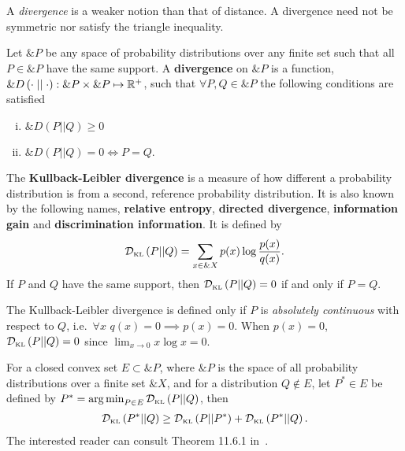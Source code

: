 \begin{remark}
  A \textit{divergence} is a weaker notion than that of distance. A divergence
  need not be symmetric nor satisfy the triangle inequality.
\end{remark}

\begin{definition}
  Let $\&P$ be any space of probability distributions over any finite set such
  that all
  $P \in \&P$ have the same support. A \textbf{divergence} on $\&P$ is a
  function, $\&D\left( \cdot \mid\mid \cdot \right): \&P \times \&P \mapsto
  \mathbb{R}^+$, such that $\forall P, Q \in \&P$ the following conditions are
  satisfied
  \begin{enumerate}[(i)]
  \item $\&D(P||Q) \geq 0$
  \item $\&D(P||Q) = 0 \iff P = Q$.
  \end{enumerate}
\end{definition}

\begin{definition}
  \label{def:kl-divergence}
  The \textbf{Kullback-Leibler divergence} is a measure of how
  different a probability distribution is from a second, reference
  probability distribution.  It is also known by the following names,
  \textbf{relative entropy}, \textbf{directed divergence},
  \textbf{information gain} and \textbf{discrimination information}.
  It is defined by
  \begin{align}
    \label{eq:KL}
    \mathcal{D}_{\text{\tiny KL}}\left( P \middle| \middle| Q \right) = \sum_{x \in \&X} p(x) \log{p(x) \over q(x)}.
  \end{align}
  If $P$ and $Q$ have the same support, then $\mathcal{D}_{\text{\tiny KL}}\left( P \middle| \middle| Q \right) = 0$ if and
  only if $P = Q$.
\end{definition}

\begin{remark}
  The Kullback-Leibler divergence is defined only if $P$ is
  \textit{absolutely continuous} with respect to $Q$, i.e.\
  $\forall x$ $q(x) = 0 \implies p(x) = 0$.  When $p(x) = 0$,
  $\mathcal{D}_{\text{\tiny KL}}\left( P \middle| \middle| Q \right) = 0$ since $\lim_{x \to 0} x\log{x} = 0$.
\end{remark}

\begin{theorem}
  For a closed convex set $E \subset \&P$, where $\&P$ is the space of
  all probability distributions over a finite set $\&X$, and for a
  distribution $Q \not \in E$, let $P^* \in E$ be defined by
  $P^* = \operatorname*{arg\,min}_{P \in E} \mathcal{D}_{\text{\tiny KL}}\left( P \middle| \middle| Q \right)$, then
  \begin{align}
   \mathcal{D}_{\text{\tiny KL}}\left( P^* \middle| \middle| Q \right) \geq \mathcal{D}_{\text{\tiny KL}}\left( P \middle| \middle| P^* \right) + \mathcal{D}_{\text{\tiny KL}}\left( P^* \middle| \middle| Q \right).
  \end{align}
  The interested reader can consult Theorem 11.6.1 in~\cite{ref:cover-thomas}.
\end{theorem}

